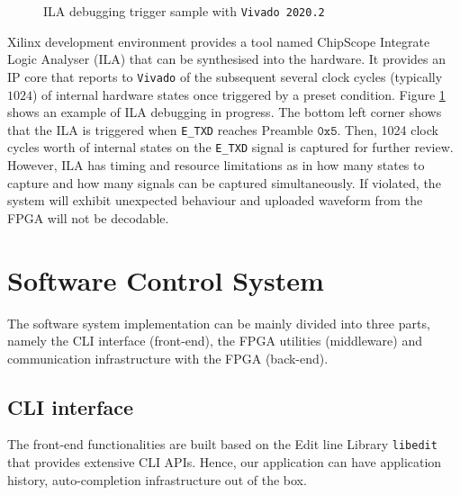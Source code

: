\documentclass[a4paper]{report}
\newcommand{\code}{\texttt}
\begin{document}
\begin{figure}[h!]
  \caption{ILA debugging trigger sample with \code{Vivado 2020.2}}
  \label{fig:ila-debug-fpga}
\end{figure}

Xilinx development environment provides a tool named ChipScope Integrate Logic Analyser (ILA) that can be synthesised into the hardware. It provides an IP core that reports to \code{Vivado} of the subsequent several clock cycles (typically $1024$) of internal hardware states once triggered by a preset condition. Figure \ref{fig:ila-debug-fpga} shows an example of ILA debugging in progress. The bottom left corner shows that the ILA is triggered when \code{E\_TXD} reaches Preamble $\mathtt{0x5}$. Then, 1024 clock cycles worth of internal states on the \code{E\_TXD} signal is captured for further review. However, ILA has timing and resource limitations as in how many states to capture and how many signals can be captured simultaneously. If violated, the system will exhibit unexpected behaviour and uploaded waveform from the FPGA will not be decodable.

\section{Software Control System}

The software system implementation can be mainly divided into three parts, namely the CLI interface (front-end), the FPGA utilities (middleware) and communication infrastructure with the FPGA (back-end).

\subsection{CLI interface}

The front-end functionalities are built based on the Edit line Library \code{libedit} that provides extensive CLI APIs. Hence, our application can have application history, auto-completion infrastructure out of the box.
\end{document}
